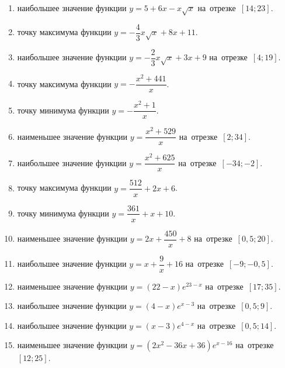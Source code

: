 \documentclass[a4paper,10pt]{article}
\begin{document}
\begin{enumerate}
\item {} наибольшее значение функции $y=5+6x -x\sqrt{x}$ на~отрезке~$\left[14;23\right]$.

\item {} точку максимума функции $y=-\dfrac{4}{3}x\sqrt{x} +8x+11$.

\item {} наибольшее значение функции $y=-\dfrac{2}{3}x\sqrt{x} +3x+9$ на~отрезке~$\left[4;19\right]$.

\item {} точку максимума функции $y=-\dfrac{x^2 +441}{x}$.

\item {} точку минимума функции $y=-\dfrac{x^2 +1}{x}$.

\item {} наименьшее значение функции $y=\dfrac{x^2 +529}{x}$ на~отрезке~$\left[2;34\right]$.

\item {} наибольшее значение функции $y=\dfrac{x^2 +625}{x}$ на~отрезке~$\left[-34;-2\right]$.

\item {} точку максимума функции $y=\dfrac{512}{x} +2x+6$.

\item {} точку минимума функции $y=\dfrac{361}{x} +x+10$.

\item {} наименьшее значение функции $y=2x+\dfrac{450}{x} +8$ на~отрезке~$\left[0,5;20\right]$.

\item {} наибольшее значение функции $y=x+\dfrac{9}{x} +16$ на~отрезке~$\left[-9;-0,5\right]$.

\item {} наименьшее значение функции $y=\left(22-x\right)e^{23-x}$ на~отрезке~$\left[17;35\right]$.

\item {} наибольшее значение функции $y=\left(4-x\right)e^{x-3}$ на~отрезке~$\left[0,5;9\right]$.

\item {} наибольшее значение функции $y=\left(x-3\right)e^{4-x}$ на~отрезке~$\left[0,5;14\right]$.

\item {} наименьшее значение функции $y=\left(2x^2 -36x +36\right)e^{x -16}$ на~отрезке~$\left[12;25\right]$.


\end{enumerate}
\end{document}
